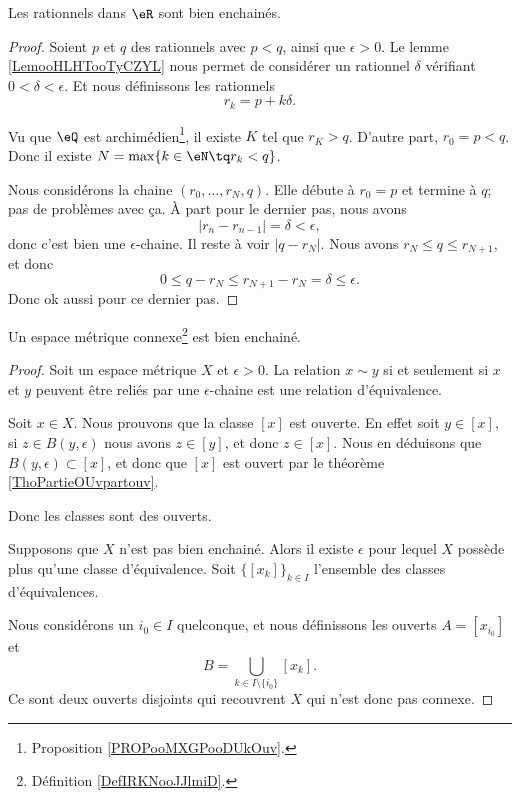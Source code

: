 \begin{lemma}
	Les rationnels dans \( \eR\) sont bien enchainés.
\end{lemma}

\begin{proof}
	Soient \( p\) et \( q\) des rationnels avec \( p<q\), ainsi que \( \epsilon>0\). Le lemme \ref{LemooHLHTooTyCZYL} nous permet de considérer un rationnel \( \delta\) vérifiant \( 0<\delta<\epsilon\). Et nous définissons les rationnels
	\begin{equation}
		r_k=p+k\delta.
	\end{equation}

	Vu que \( \eQ\) est archimédien\footnote{Proposition \ref{PROPooMXGPooDUkOuv}.}, il existe \( K\) tel que \( r_{K}>q\). D'autre part, \( r_0=p<q\). Donc il existe \( N=\max\{ k\in \eN\tq r_k<q \}\).

	Nous considérons la chaine \( (r_0,\ldots, r_N, q)\). Elle débute à \( r_0=p\) et termine à \( q\); pas de problèmes avec ça. À part pour le dernier pas, nous avons
	\begin{equation}
		| r_n-r_{n-1} |=\delta<\epsilon,
	\end{equation}
	donc c'est bien une \( \epsilon\)-chaine. Il reste à voir \( | q-r_N |\). Nous avons \( r_N\leq q\leq r_{N+1}\), et donc
	\begin{equation}
		0\leq q-r_N\leq r_{N+1}-r_N=\delta\leq \epsilon.
	\end{equation}
	Donc ok aussi pour ce dernier pas.
\end{proof}

\begin{proposition}       \label{PROPooBUNOooIvfugn}
	Un espace métrique connexe\footnote{Définition \ref{DefIRKNooJJlmiD}.} est bien enchainé.
\end{proposition}

\begin{proof}
	Soit un espace métrique \( X\) et \( \epsilon>0\). La relation \( x\sim y\) si et seulement si \( x\) et \( y\) peuvent être reliés par une \( \epsilon\)-chaine est une relation d'équivalence.

	Soit \( x\in X\). Nous prouvons que la classe \( [x]\) est ouverte. En effet soit \( y\in [x]\), si \( z\in B(y,\epsilon)\) nous avons \( z\in [y]\), et donc \( z\in [x]\). Nous en déduisons que \( B(y,\epsilon)\subset [x]\), et donc que \( [x]\) est ouvert par le théorème \ref{ThoPartieOUvpartouv}.

	Donc les classes sont des ouverts.

	Supposons que \( X\) n'est pas bien enchainé. Alors il existe \( \epsilon\) pour lequel \( X\) possède plus qu'une classe d'équivalence. Soit \( \{ [x_k] \}_{k\in I}\) l'ensemble des classes d'équivalences.

	Nous considérons un \( i_0\in I\) quelconque, et nous définissons les ouverts \( A=[x_{i_0}]\) et
	\begin{equation}
		B=\bigcup_{k\in I\setminus\{ i_0 \}}[x_k].
	\end{equation}
	Ce sont deux ouverts disjoints qui recouvrent \( X\) qui n'est donc pas connexe.
\end{proof}

